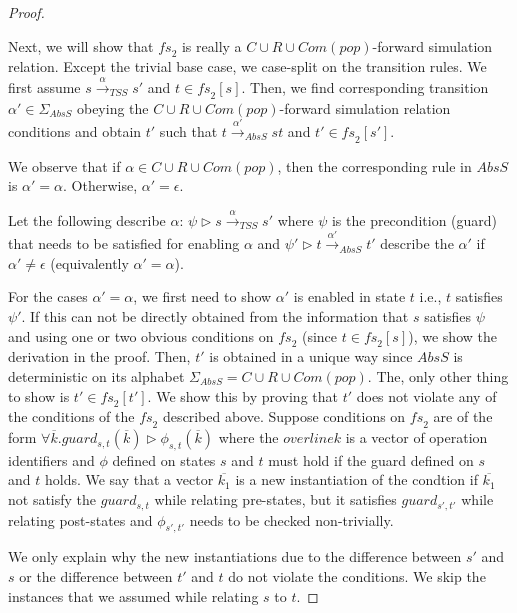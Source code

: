 \begin{proof}
\begin{itemize}
\end{itemize}
Next, we will show that $\mathit{fs}_2$ is really a $C\cup R\cup Com(pop)$-forward simulation relation. Except the trivial base case, we case-split on the transition rules. We first assume $s \xrightarrow{\alpha}_{TSS} s' $ and $t \in \mathit{fs}_2[s]$. Then, we find  corresponding transition $\alpha' \in \Sigma_{AbsS}$ obeying the $C\cup R\cup Com(pop)$-forward simulation relation conditions and obtain $t'$ such that $t \xrightarrow{\alpha'}_{AbsS} st $  and $t' \in \mathit{fs}_2[s']$.

We observe that if $\alpha \in C \cup R \cup Com(pop)$, then the corresponding rule in $AbsS$ is $\alpha' = \alpha$. Otherwise, $\alpha' = \epsilon$.

Let the following describe $\alpha$: $\psi \triangleright s\xrightarrow{\alpha}_{TSS} s'$ where $\psi$ is the precondition (guard) that needs to be satisfied for enabling $\alpha$ and $\psi' \triangleright t \xrightarrow{\alpha'}_{AbsS} t'$ describe the $\alpha'$ if $\alpha' \neq \epsilon$ (equivalently $\alpha' = \alpha$).

For the cases $\alpha' = \alpha$, we first need to show $\alpha'$ is enabled in state $t$ i.e., $t$ satisfies $\psi'$. If this can not be directly obtained from the information that $s$ satisfies $\psi$ and using one or two obvious conditions on $\mathit{fs}_2$ (since $t \in \mathit{fs}_2[s]$), we show the derivation in the proof. Then, $t'$ is obtained in a unique way since $AbsS$ is deterministic on its alphabet $ \Sigma_{AbsS} = C \cup R \cup Com(pop)$. The, only other thing to show is $t' \in \mathit{fs}_2[t']$. We show this by proving that $t'$ does not violate any of the conditions of the $\mathit{fs}_2$ described above. Suppose conditions on $\mathit{fs}_2$ are of the form $\forall \overline{k}. guard_{s,t}(\overline{k}) \triangleright \phi_{s,t}(\overline{k})$ where the $overline{k}$ is a vector of operation identifiers and $\phi$ defined on states $s$ and $t$ must hold if the guard defined on $s$ and $t$ holds. We say that a vector $\overline{k_1}$ is a new instantiation of the condtion if $\overline{k_1}$ not satisfy the $guard_{s,t}$ while relating pre-states, but it satisfies $guard_{s',t'}$ while relating post-states and $\phi_{s',t'}$ needs to be checked non-trivially.

We only explain why the new instantiations due to the difference between $s'$ and $s$ or the difference between $t'$ and $t$ do not violate the conditions. We skip the instances that we assumed while relating $s$ to $t$.


\end{proof}
